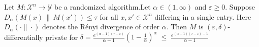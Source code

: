Let $M : \mathcal{X}^n \to \mathcal{Y}$ be a randomized algorithm.Let $\alpha \in (1,\infty)$ and $\varepsilon \ge 0$. Suppose $D_\alpha\!\left(M(x)\,\|\,M(x')\right) \le \tau$ for all $x,x' \in \mathcal{X}^n$ differing in a single entry. Here $D_\alpha(\cdot\|\cdot)$ denotes the Rényi divergence of order $\alpha$. Then $M$ is $(\varepsilon,\delta)$-differentially private for $\delta= \frac{e^{(\alpha-1)(\tau-\varepsilon)}}{\alpha-1}\left(1 - \frac{1}{\alpha}\right)^{\!\alpha}\;\le\;\frac{e^{(\alpha-1)(\tau-\varepsilon)- 1} }{\alpha-1}$